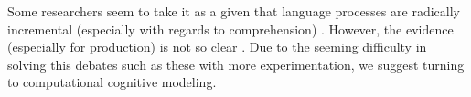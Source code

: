Some researchers seem to take it as a given that language processes are radically incremental (especially with regards to comprehension) \citep{tag1}\citep{radical}. However, the evidence (especially for production) is not so clear \citep{incremental}. Due to the seeming difficulty in solving this debates such as these with more experimentation, we suggest turning to computational cognitive modeling.
 
